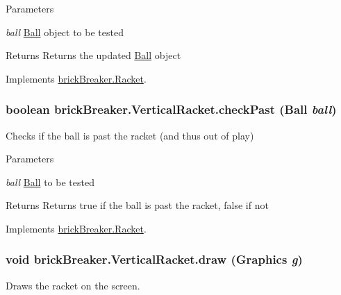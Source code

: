 \begin{DoxyParams}{Parameters}
\item[{\em ball}]\hyperlink{classbrick_breaker_1_1_ball}{Ball} object to be tested \end{DoxyParams}
\begin{DoxyReturn}{Returns}
Returns the updated \hyperlink{classbrick_breaker_1_1_ball}{Ball} object 
\end{DoxyReturn}


Implements \hyperlink{classbrick_breaker_1_1_racket}{brickBreaker.Racket}.

\hypertarget{classbrick_breaker_1_1_vertical_racket_ac9edcb855d560fa5771da4e12abb4e71}{
\subsubsection[{checkPast}]{\setlength{\rightskip}{0pt plus 5cm}boolean brickBreaker.VerticalRacket.checkPast ({\bf Ball} {\em ball})}}
\label{classbrick_breaker_1_1_vertical_racket_ac9edcb855d560fa5771da4e12abb4e71}
Checks if the ball is past the racket (and thus out of play)


\begin{DoxyParams}{Parameters}
\item[{\em ball}]\hyperlink{classbrick_breaker_1_1_ball}{Ball} to be tested \end{DoxyParams}
\begin{DoxyReturn}{Returns}
Returns true if the ball is past the racket, false if not 
\end{DoxyReturn}


Implements \hyperlink{classbrick_breaker_1_1_racket}{brickBreaker.Racket}.

\hypertarget{classbrick_breaker_1_1_vertical_racket_ac455ce02602cbf621997042439809ee5}{
\subsubsection[{draw}]{\setlength{\rightskip}{0pt plus 5cm}void brickBreaker.VerticalRacket.draw (Graphics {\em g})}}
\label{classbrick_breaker_1_1_vertical_racket_ac455ce02602cbf621997042439809ee5}
Draws the racket on the screen.


